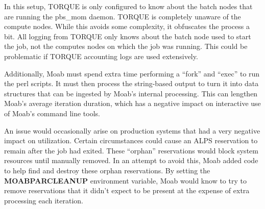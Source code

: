In this setup, TORQUE is only configured to know about the batch nodes that are
running the pbs_mom daemon.  TORQUE is completely unaware of the compute nodes.
While this avoids some complexity, it obfuscates the process a bit.  All
logging from TORQUE only knows about the batch node used to start the job, not
the computes nodes on which the job was running.  This could be problematic if
TORQUE accounting logs are used extensively.

Additionally, Moab must spend extra time performing a ``fork'' and ``exec'' to
run the perl scripts.  It must then process the string-based output to turn it
into data structures that can be ingested by Moab's internal processing.  This
can lengthen Moab's average iteration duration, which has a negative impact on
interactive use of Moab's command line tools.

An issue would occasionally arise on production systems that had a very
negative impact on utilization.  Certain circumstances could cause an ALPS
reservation to remain after the job had exited.  These ``orphan'' reservations
would block system resources until manually removed.  In an attempt to avoid
this, Moab added code to help find and destroy these orphan reservations.  By
setting the \textbf{MOABPARCLEANUP} environment variable, Moab would know to
try to remove reservations that it didn't expect to be present at the expense
of extra processing each iteration.

